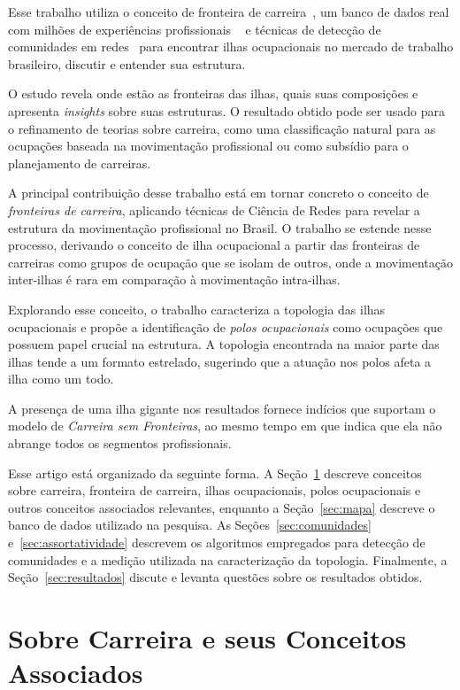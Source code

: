 \documentclass[
  article,
  11pt,
  a4paper,
  english,
  brazil,
  sumario=tradicional]{abntex2}
\begin{document}
Esse trabalho utiliza o conceito de fronteira de carreira~\cite{Gunz2007-hr}, um banco de dados real com milhões de experiências profissionais ~\cite{VAGAS_Tecnologia2014-yv} e técnicas de detecção de comunidades em redes~\cite{Rosvall2009-sd,Edler2017-kt} para encontrar ilhas ocupacionais no mercado de trabalho brasileiro, discutir e entender sua estrutura.

O estudo revela onde estão as fronteiras das ilhas, quais suas composições e apresenta \textit{insights} sobre suas estruturas. O resultado obtido pode ser usado para o refinamento de teorias sobre carreira, como uma classificação natural para as ocupações baseada na movimentação profissional ou como subsídio para o planejamento de carreiras.

A principal contribuição desse trabalho está em tornar concreto o conceito de \textit{fronteiras de carreira}, aplicando técnicas de Ciência de Redes para revelar a estrutura da movimentação profissional no Brasil. O trabalho se estende nesse processo, derivando o conceito de ilha ocupacional a partir das fronteiras de carreiras como grupos de ocupação que se isolam de outros, onde a movimentação inter-ilhas é rara em comparação à movimentação intra-ilhas.

Explorando esse conceito, o trabalho caracteriza a topologia das ilhas ocupacionais e propõe a identificação de \textit{polos ocupacionais} como ocupações que possuem papel crucial na estrutura. A topologia encontrada na maior parte das ilhas tende a um formato estrelado, sugerindo que a atuação nos polos afeta a ilha como um todo.

A presença de uma ilha gigante nos resultados fornece indícios que suportam o modelo de \textit{Carreira sem Fronteiras}, ao mesmo tempo em que indica que ela não abrange todos os segmentos profissionais.

Esse artigo está organizado da seguinte forma. A Seção~\ref{sec:carreira} descreve conceitos sobre carreira, fronteira de carreira, ilhas ocupacionais, polos ocupacionais e outros conceitos associados relevantes, enquanto a Seção~\ref{sec:mapa} descreve o banco de dados utilizado na pesquisa. As Seções~\ref{sec:comunidades} e~\ref{sec:assortatividade} descrevem os algoritmos empregados para detecção de comunidades e a medição utilizada na caracterização da topologia. Finalmente, a Seção~\ref{sec:resultados} discute e levanta questões sobre os resultados obtidos.

\section{Sobre Carreira e seus Conceitos Associados} \label{sec:carreira}
\end{document}
